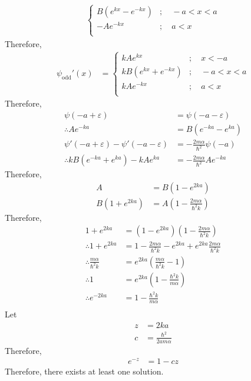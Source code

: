 \documentclass[fleqn, a4paper, 11pt, oneside]{amsart}
\theoremstyle{definition}
\theoremstyle{theorem}
\begin{document}
\begin{solution}
\begin{align*}
\begin{cases}
				B \left( e^{k x} - e^{-k x} \right) &;\quad -a < x < a\\
				-A e^{-k x} &;\quad a < x\\
			\end{cases}
	\end{align*}
	Therefore,
	\begin{align*}
		{\psi_{\text{odd}}}'(x) &=
			\begin{cases}
				k A e^{k x} &;\quad x < -a\\
				k B \left( e^{k x} + e^{-k x} \right) &;\quad -a < x < a\\
				k A e^{-k x} &;\quad a < x\\
			\end{cases}
	\end{align*}
	Therefore,
	\begin{align*}
		\psi(-a + \varepsilon) &= \psi(-a - \varepsilon)\\
		\therefore A e^{-k a} &= B \left( e^{- k a} - e^{k a} \right)\\
		\psi'(-a + \varepsilon) - \psi'(-a - \varepsilon) &= -\frac{2 m \alpha}{\hbar^2} \psi(-a)\\
		\therefore k B \left( e^{-k a} + e^{k a} \right) - k A e^{k a} &= -\frac{2 m \alpha}{\hbar^2} A e^{-k a}
	\end{align*}
	Therefore,
	\begin{align*}
		A &= B \left( 1 - e^{2 k a} \right)\\
		B \left( 1 + e^{2 k a} \right) &= A \left( 1 - \frac{2 m \alpha}{\hbar^2 k} \right)
	\end{align*}
	Therefore,
	\begin{align*}
		1 + e^{2 k a} &= \left( 1 - e^{2 k a} \right) \left( 1 - \frac{2 m \alpha}{\hbar^2 k} \right)\\
		\therefore 1 + e^{2 k a} &= 1 - \frac{2 m \alpha}{\hbar^2 k} - e^{2 k a} + e^{2 k a} \frac{2 m \alpha}{\hbar^2 k}\\
		\therefore \frac{m \alpha}{\hbar^2 k} &= e^{2 k a} \left( \frac{m \alpha}{\hbar^2 k} - 1 \right)\\
		\therefore 1 &= e^{2 k a} \left( 1 - \frac{\hbar^2 k}{m \alpha} \right)\\
		\therefore e^{-2 k a} &= 1 - \frac{\hbar^2 k}{m \alpha}\\
	\end{align*}
	Let
	\begin{align*}
		z &= 2 k a\\
		c &= \frac{\hbar^2}{2 a m \alpha}
	\end{align*}
	Therefore,
	\begin{align*}
		e^{-z} &= 1 - c z
	\end{align*}
	Therefore, there exists at least one solution.
\end{solution}
\end{document}
